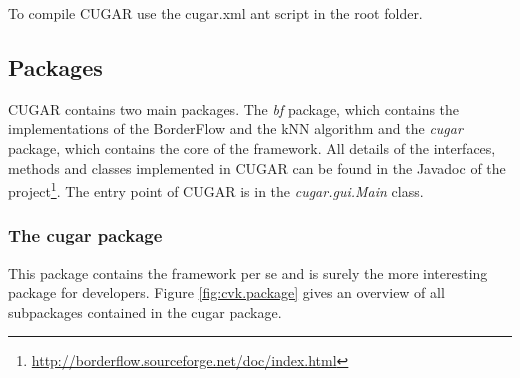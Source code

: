 \documentclass[a4paper, 11pt]{article}
\begin{document}
	To compile CUGAR use the cugar.xml ant script in the root folder.
	\subsection{Packages}
		CUGAR contains two main packages. 
		The \emph{bf} package, which contains the implementations of the  BorderFlow and the kNN algorithm 
		and the \emph{cugar} package, which contains the core of the framework. 
		All details of the interfaces, methods and classes implemented in CUGAR can be found in the Javadoc 
		of the project\footnote{\url{http://borderflow.sourceforge.net/doc/index.html}}.
		The entry point of CUGAR is in the \emph{cugar.gui.Main} class.

	\subsubsection{The cugar package}
		This package contains the framework per se and is surely the more interesting package for developers. 
		Figure \ref{fig:cvk.package} gives an overview of all subpackages contained in the cugar package.
\end{document}
